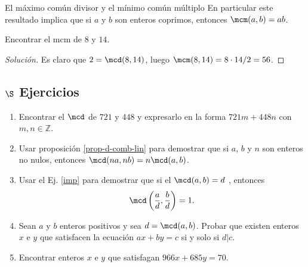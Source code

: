 \begin{section}{El máximo común divisor y el mínimo común
múltiplo}
En particular este resultado implica que si $a$ y $b$ son enteros
coprimos, entonces $\mcm(a,b)=ab$.


\begin{ejemplo*} Encontrar el  mcm de $8$ y $14$.
    \begin{proof}[Solución] 
        Es claro que $2 = \mcd(8,14)$, luego $\mcm(8,14) = 8 \cdot 14 / 2 = 56$. 
    \end{proof}
\end{ejemplo*}

\subsection*{$\S$ Ejercicios}

\begin{enumerate}
\item Encontrar el $\mcd$ de $721$ y $448$ y expresarlo en la forma
$721m+448n$ con $m,n \in \mathbb Z$.
\item\label{imp} Usar  proposición \ref{prop-d-comb-lin} para demostrar que si $a$, $b$ y $n$ son enteros no nulos, entonces
$\mcd(na,nb)=n\mcd(a,b)$.
\item Usar el  Ej. \ref{imp} para demostrar que si el
$\mcd(a,b)=d$ , entonces
$$
\mcd\left(\frac{a}{d},\frac{b}{d}\right) =1.
$$
\item  Sean $a$ y $b$ enteros positivos y sea $d=\mcd(a,b)$. Probar que existen
enteros $ x$ e $y$ que satisfacen la ecuación $ax+by=c$ si y solo
si $d|c$.
\item  Encontrar enteros $x$ e $y$ que satisfagan $966x+685y=70.$
\end{enumerate}


\end{section}


